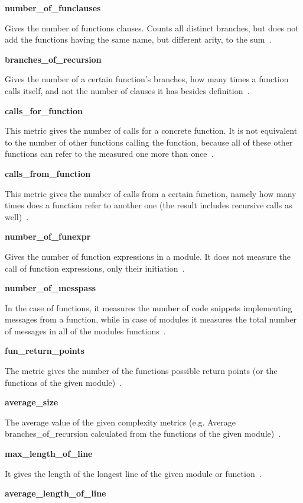 \textbf{number\_of\_funclauses}

Gives the number of functions clauses. Counts all distinct branches, but does not add the functions having the same name, but different arity, to the sum~\cite{refactorerlm}.

\textbf{branches\_of\_recursion}

Gives the number of a certain function's branches, how many times a function calls itself, and not the number of clauses it has besides definition~\cite{refactorerlm}.

\textbf{calls\_for\_function}

This metric gives the number of calls for a concrete function. It is not equivalent to the number of other functions calling the function, because all of these other functions can refer to the measured one more than once~\cite{refactorerlm}.

\textbf{calls\_from\_function}

This metric gives the number of calls from a certain function, namely how many times does a function refer to another one (the result includes recursive calls as well)~\cite{refactorerlm}.

\textbf{number\_of\_funexpr}

Gives the number of function expressions in a module. It does not measure the call of function expressions, only their initiation~\cite{refactorerlm}.

\textbf{number\_of\_messpass}

In the case of functions, it measures the number of code snippets implementing messages from a function, while in case of modules it measures the total number of messages in all of the modules functions~\cite{refactorerlm}.

\textbf{fun\_return\_points}

The metric gives the number of the functions possible return points (or the functions of the given module)~\cite{refactorerlm}.

\textbf{average\_size}

The average value of the given complexity metrics (e.g. Average branches\_of\_recursion calculated from the functions of the given module)~\cite{refactorerlm}.

\textbf{max\_length\_of\_line}

It gives the length of the longest line of the given module or function~\cite{refactorerlm}.

\textbf{average\_length\_of\_line}

